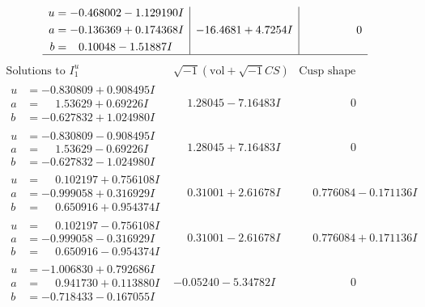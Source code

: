 \documentclass[1p]{elsarticle_modified}
\theoremstyle{definition}
\newcommand{\I}{\sqrt{-1}}
\begin{document}
$$\begin{array}{c|c|c}
\begin{aligned}
u &= -0.468002 - 1.129190 I \\
a &= -0.136369 + 0.174368 I \\
b &= \phantom{-}0.10048 - 1.51887 I\end{aligned}
 & -16.4681 + 4.7254 I & \phantom{-0.000000 } 0\\
 \hline 
 \end{array}$$\newpage$$\begin{array}{c|c|c}  
\text{Solutions to }I^u_{1}& \I (\text{vol} + \sqrt{-1}CS) & \text{Cusp shape}\\
 \hline 
\begin{aligned}
u &= -0.830809 + 0.908495 I \\
a &= \phantom{-}1.53629 + 0.69226 I \\
b &= -0.627832 + 1.024980 I\end{aligned}
 & \phantom{-}1.28045 - 7.16483 I & \phantom{-0.000000 } 0 \\ \hline\begin{aligned}
u &= -0.830809 - 0.908495 I \\
a &= \phantom{-}1.53629 - 0.69226 I \\
b &= -0.627832 - 1.024980 I\end{aligned}
 & \phantom{-}1.28045 + 7.16483 I & \phantom{-0.000000 } 0 \\ \hline\begin{aligned}
u &= \phantom{-}0.102197 + 0.756108 I \\
a &= -0.999058 + 0.316929 I \\
b &= \phantom{-}0.650916 + 0.954374 I\end{aligned}
 & \phantom{-}0.31001 + 2.61678 I & \phantom{-}0.776084 - 0.171136 I \\ \hline\begin{aligned}
u &= \phantom{-}0.102197 - 0.756108 I \\
a &= -0.999058 - 0.316929 I \\
b &= \phantom{-}0.650916 - 0.954374 I\end{aligned}
 & \phantom{-}0.31001 - 2.61678 I & \phantom{-}0.776084 + 0.171136 I \\ \hline\begin{aligned}
u &= -1.006830 + 0.792686 I \\
a &= \phantom{-}0.941730 + 0.113880 I \\
b &= -0.718433 - 0.167055 I\end{aligned}
 & -0.05240 - 5.34782 I & \phantom{-0.000000 } 0 \\ \hline\begin{aligned}

\end{aligned}
\end{array}$$
\end{document}

